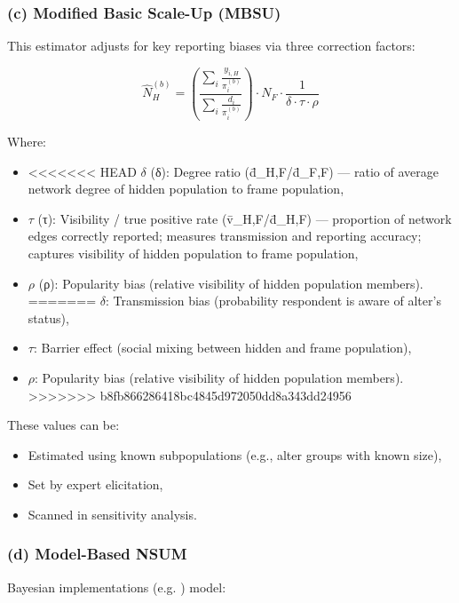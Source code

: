 \documentclass[
  12pt,
  letterpaper,
  DIV=11,
  numbers=noendperiod]{scrartcl}
\theoremstyle{plain}
\theoremstyle{definition}
\begin{document}
{\subsubsection{(c) Modified Basic Scale-Up
(MBSU)}\label{c-modified-basic-scale-up-mbsu}

This estimator adjusts for key reporting biases via three correction
factors:

\[\hat{N}_H^{(b)} = \left( \frac{\sum_{i} \frac{y_{i,H}}{\pi_i^{(b)}}}{\sum_{i} \frac{d_i}{\pi_i^{(b)}}} \right) \cdot N_F \cdot \frac{1}{\delta \cdot \tau \cdot \rho}\]

Where:

\begin{itemize}
\item
<<<<<<< HEAD
  \(\delta\) (δ): Degree ratio (d̄\_H,F/d̄\_F,F) --- ratio of average
  network degree of hidden population to frame population,
\item
  \(\tau\) (τ): Visibility / true positive rate (v̄\_H,F/d̄\_H,F) ---
  proportion of network edges correctly reported; measures transmission
  and reporting accuracy; captures visibility of hidden population to
  frame population,
\item
  \(\rho\) (ρ): Popularity bias (relative visibility of hidden
  population members).
=======
  \(\delta\): Transmission bias (probability respondent is aware of
  alter's status),
\item
  \(\tau\): Barrier effect (social mixing between hidden and frame
  population),
\item
  \(\rho\): Popularity bias (relative visibility of hidden population
  members).
>>>>>>> b8fb866286418bc4845d972050dd8a343dd24956
\end{itemize}

These values can be:

\begin{itemize}
\item
  Estimated using known subpopulations (e.g., alter groups with known
  size),
\item
  Set by expert elicitation,
\item
  Scanned in sensitivity analysis.
\end{itemize}

\subsubsection{(d) Model-Based NSUM}\label{d-model-based-nsum}

Bayesian implementations (e.g. \textcite{malt15-estimating}) model:

}
\end{document}
